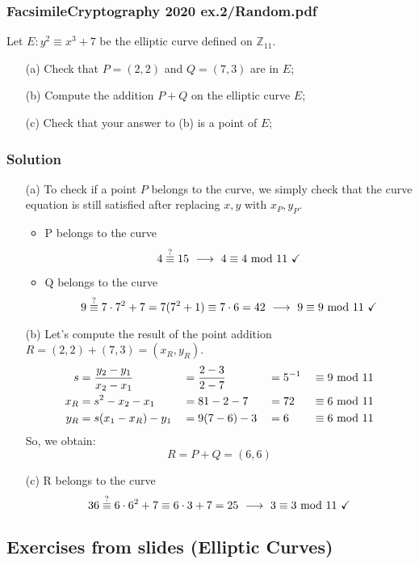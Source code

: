 \newpage
\subsubsection{FacsimileCryptography 2020 ex.2/Random.pdf}
Let $E:y^2\equiv x^3+7$ be the elliptic curve defined on $\mathbb{Z}_{11}$.
\begin{itemize}
    \item[(a)] Check that $P=(2,2)$ and $Q=(7,3)$ are in $E$;
    \item[(b)] Compute the addition $P+Q$ on the elliptic curve $E$;
    \item[(c)] Check that your answer to (b) is a point of $E$;
\end{itemize}

\subsubsection*{Solution}
\begin{itemize}
    \item[(a)] To check if a point $P$ belongs to the curve, we simply check that the curve equation is still satisfied after replacing $x,y$ with $x_P,y_P$.
    \begin{itemize}
        \item P belongs to the curve
        $$4\stackrel{\text{?}}{\equiv}15\ \longrightarrow\ 4\equiv4\mymod11\text{ \checkmark}$$
        \item Q belongs to the curve
        $$9\stackrel{\text{?}}{\equiv}7\cdot7^2+7=7(7^2+1)\equiv7\cdot6=42\ \longrightarrow\ 9\equiv9\mymod11\text{ \checkmark}$$
    \end{itemize}
    \item[(b)] Let's compute the result of the point addition $R=(2,2)+(7,3)=(x_R,y_R)$.
    \begin{alignat*}{4}
        s&=\dfrac{y_2-y_1}{x_2-x_1}&&=\dfrac{2-3}{2-7}&&=5^{-1}&&\equiv9\text{ mod }11\\
        x_R&=s^2-x_2-x_1&&=81-2-7&&=72&&\equiv6\text{ mod }11\\
        y_R&=s(x_1-x_R)-y_1&&=9(7-6)-3&&=6&&\equiv6\text{ mod }11
    \end{alignat*}
    So, we obtain:
    $$R=P+Q=(6,6)$$
    \item[(c)] R belongs to the curve
    $$36\stackrel{\text{?}}{\equiv}6\cdot6^2+7\equiv6\cdot3+7=25\ \longrightarrow\ 3\equiv3\mymod11\text{ \checkmark}$$
\end{itemize}

\newpage
\subsection{Exercises from slides (Elliptic Curves)}
